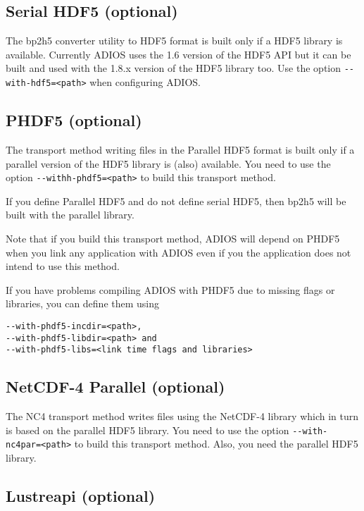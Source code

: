 \subsection{Serial HDF5 (optional)}

The bp2h5 converter utility to HDF5 format is built only if a HDF5 library is available. 
Currently ADIOS uses the 1.6 version of the HDF5 API but it can be built and used 
with the 1.8.x version of the HDF5 library too. Use the option \verb+--with-hdf5=<path>+ 
when configuring ADIOS.

\subsection{PHDF5 (optional)}

The transport method writing files in the Parallel HDF5 format is built only if 
a parallel version of the HDF5 library is (also) available. You need to use the 
option \verb+--withh-phdf5=<path>+ to build this transport method. 

If you define Parallel HDF5 and do not define serial HDF5, then bp2h5 will be built 
with the parallel library. 

Note that if you build this transport method, ADIOS will depend on PHDF5 when you 
link any application with ADIOS even if you the application does not intend to 
use this method. 

If you have problems compiling ADIOS with PHDF5 due to missing flags or libraries, 
you can define them using 

\begin{lstlisting}
--with-phdf5-incdir=<path>,
--with-phdf5-libdir=<path> and 
--with-phdf5-libs=<link time flags and libraries>
\end{lstlisting}

\subsection{NetCDF-4 Parallel (optional)}

The NC4 transport method writes files using the NetCDF-4 library which in turn 
is based on the parallel HDF5 library. You need to use the option 
\verb+--with-nc4par=<path>+ to build this transport method. Also, 
you need the parallel HDF5 library. 

\subsection{Lustreapi (optional)}


